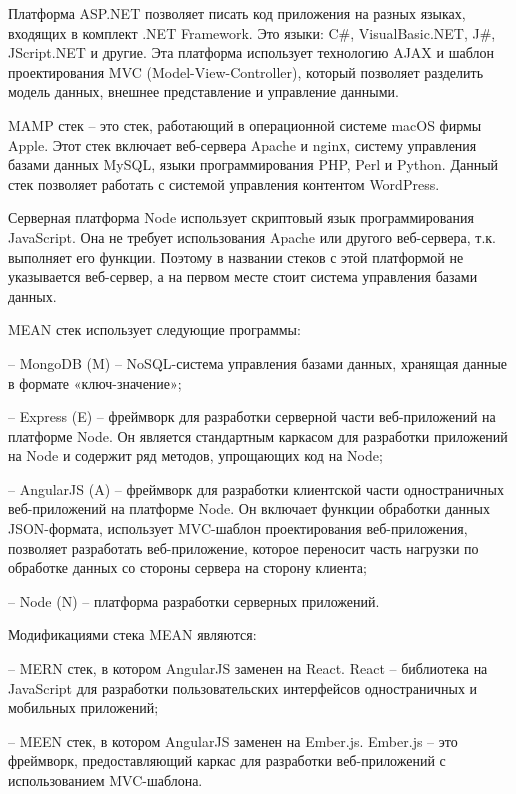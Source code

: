 Платформа ASP.NET позволяет писать код приложения на разных языках, входящих в комплект .NET Framework.
Это языки: C\#, VisualBasic.NET, J\#, JScript.NET и другие.
Эта платформа использует технологию AJAX и шаблон проектирования MVC (Model-View-Controller), который позволяет разделить модель данных, внешнее представление и управление данными.


MAMP стек – это стек, работающий в операционной системе macOS фирмы Apple.
Этот стек включает веб-сервера Apache и nginх, систему управления базами данных MySQL, языки программирования PHP, Perl и Python.
Данный стек позволяет работать с системой управления контентом WordPress.

Серверная платформа Node \cite{davidovsky-vibor-NODE} использует скриптовый язык программирования JavaScript.
Она не требует использования Apache или другого веб-сервера, т.к. выполняет его функции.
Поэтому в названии стеков с этой платформой не указывается веб-сервер, а на первом месте стоит система управления базами данных.


MEAN стек \cite{davidovsky-vibor-mean} использует следующие программы:

-- MongoDB (M) -- NoSQL-система управления базами данных, хранящая данные в формате
«ключ-значение»;

-- Express (E) -- фреймворк для разработки серверной части веб-приложений на платформе Node. Он является стандартным каркасом для разработки приложений на Node и содержит ряд методов, упрощающих код на Node;

-- AngularJS (A) -- фреймворк для разработки клиентской части одностраничных веб-приложений на платформе Node.
Он включает функции обработки данных JSON-формата, использует MVC-шаблон проектирования веб-приложения, позволяет разработать веб-приложение, которое переносит часть нагрузки по обработке данных со стороны сервера на сторону клиента;

-- Node (N) -- платформа разработки серверных приложений.

Модификациями стека MEAN являются:

-- MERN стек, в котором AngularJS заменен на React.
React -- библиотека на JavaScript для разработки пользовательских интерфейсов одностраничных и мобильных приложений;

-- MEEN стек, в котором AngularJS заменен на Ember.js.
Ember.js -- это фреймворк, предоставляющий каркас для разработки веб-приложений с использованием MVC-шаблона.

